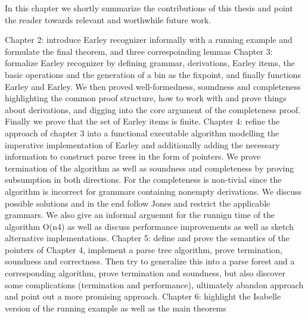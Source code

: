 %
\begin{isabellebody}%
%
%
\isadelimtheory
%
\endisadelimtheory
%
\isatagtheory
%
\endisatagtheory
{\isafoldtheory}%
%
\isadelimtheory
%
\endisadelimtheory
%
\isadelimdocument
%
\endisadelimdocument
%
\isatagdocument
%
\isamarkuptrue%
%
\endisatagdocument
{\isafolddocument}%
%
\isadelimdocument
%
\endisadelimdocument
%
\begin{isamarkuptext}%
In this chapter we shortly summarize the contributions of this thesis and point the reader towards
relevant and worthwhile future work.%
\end{isamarkuptext}\isamarkuptrue%
%
\isadelimdocument
%
\endisadelimdocument
%
\isatagdocument
%
\isamarkuptrue%
%
\endisatagdocument
{\isafolddocument}%
%
\isadelimdocument
%
\endisadelimdocument
%
\begin{isamarkuptext}%
Chapter 2: introduce Earley recognizer informally with a running example and formulate the final theorem, and three correspoinding lemmas
Chapter 3: formalize Earley recognizer by defining grammar, derivations, Earley items, the basic operations and the generation of a bin
  as the fixpoint, and finally functions Earley and Earley. We then proved well-formedness, soundness and completeness highlighting
  the common proof structure, how to work with and prove things about derivations, and digging into the core argument of the completeness
  proof. Finally we prove that the set of Earley items is finite.
Chapter 4: refine the approach of chapter 3 into a functional executable algorithm modelling the imperative implementation of Earley and
  additionally adding the necessary information to construct parse trees in the form of pointers. We prove termination of the algorithm
  as well as soundness and completeness by proving subsumption in both directions. For the completeness is non-tivial since the algorithm
  is incorrect for grammars containing nonempty derivations. We discuss possible solutions and in the end follow Jones and restrict the
  applicable grammars. We also give an informal arguemnt for the runnign time of the algorithm O(n4) as well as discuss performance improvements as well as
  sketch alternative implementations.
Chapter 5: define and prove the semantics of the pointers of Chapter 4, implement a parse tree algorithm,
  prove termination, soundness and correctness. Then try to generalize this into a parse forest and a corresponding
  algorithm, prove termination and soundness, but also discover some complications (termination and performance),
  ultimately abandon approach and point out a more promising approach.
Chapter 6: highlight the Isabelle version of the running example as well as the main theorems


\end{isamarkuptext}
\end{isabellebody}
